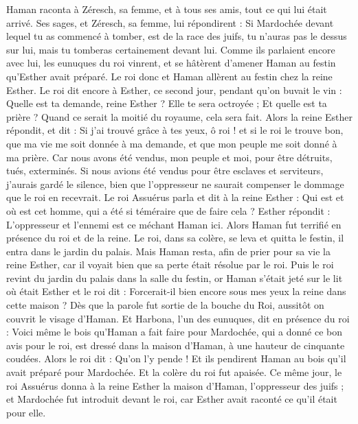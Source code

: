 \begin{multicols}{2}
Haman raconta à Zéresch, sa femme, et à tous ses amis, tout ce qui lui était arrivé. Ses sages, et Zéresch, sa femme, lui répondirent : Si Mardochée devant lequel tu as commencé à tomber, est de la race des juifs, tu n'auras pas le dessus sur lui, mais tu tomberas certainement devant lui.
Comme ils parlaient encore avec lui, les eunuques du roi vinrent, et se hâtèrent d'amener Haman au festin qu'Esther avait préparé.
\VerseOne{}Le roi donc et Haman allèrent au festin chez la reine Esther.
Le roi dit encore à Esther, ce second jour, pendant qu’on buvait le vin : Quelle est ta demande, reine Esther ? Elle te sera octroyée ; Et quelle est ta prière ? Quand ce serait la moitié du royaume, cela sera fait.
Alors la reine Esther répondit, et dit : Si j'ai trouvé grâce à tes yeux, ô roi ! et si le roi le trouve bon, que ma vie me soit donnée à ma demande, et que mon peuple me soit donné à ma prière.
Car nous avons été vendus, mon peuple et moi, pour être détruits, tués, exterminés. Si nous avions été vendus pour être esclaves et serviteurs, j’aurais gardé le silence, bien que l'oppresseur ne saurait compenser le dommage que le roi en recevrait.
Le roi Assuérus parla et dit à la reine Esther : Qui est et où est cet homme, qui a été si téméraire que de faire cela ?
Esther répondit : L'oppresseur et l’ennemi est ce méchant Haman ici. Alors Haman fut terrifié en présence du roi et de la reine.
Le roi, dans sa colère, se leva et quitta le festin, il entra dans le jardin du palais. Mais Haman resta, afin de prier pour sa vie la reine Esther, car il voyait bien que sa perte était résolue par le roi.
Puis le roi revint du jardin du palais dans la salle du festin, or Haman s’était jeté sur le lit où était Esther et le roi dit : Forcerait-il bien encore sous mes yeux la reine dans cette maison ? Dès que la parole fut sortie de la bouche du Roi, aussitôt on couvrit le visage d’Haman.
Et Harbona, l'un des eunuques, dit en présence du roi : Voici même le bois qu'Haman a fait faire pour Mardochée, qui a donné ce bon avis pour le roi, est dressé dans la maison d'Haman, à une hauteur de cinquante coudées. Alors le roi dit : Qu’on l'y pende !
Et ils pendirent Haman au bois qu'il avait préparé pour Mardochée. Et la colère du roi fut apaisée.
\VerseOne{}Ce même jour, le roi Assuérus donna à la reine Esther la maison d'Haman, l'oppresseur des juifs ; et Mardochée fut introduit devant le roi, car Esther avait raconté ce qu’il était pour elle.

\end{multicols}
